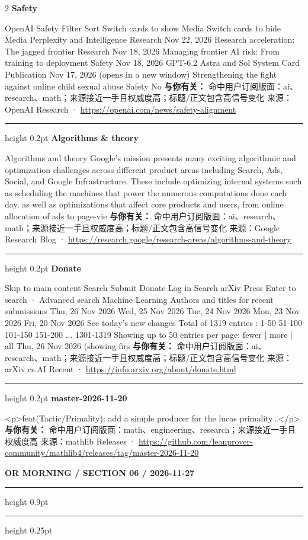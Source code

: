 \documentclass[10.5pt]{ctexart}
\begin{document}
\begin{multicols}{2}
{\large\bfseries Safety}\par
OpenAI Safety Filter Sort Switch cards to show Media Switch cards to hide Media Perplexity and Intelligence Research Nov 22, 2026 Research acceleration: The jagged frontier Research Nov 18, 2026 Managing frontier AI risk: From training to deployment Safety Nov 18, 2026 GPT‑6.2 Astra and Sol System Card Publication Nov 17, 2026 (opens in a new window) Strengthening the fight against online child sexual abuse Safety No
\textbf{与你有关：} 命中用户订阅版面：ai、research、math；来源接近一手且权威度高；标题/正文包含高信号变化
{\footnotesize\color{ormuted} 来源：OpenAI Research · \url{https://openai.com/news/safety-alignment}}
\vspace{2mm}
\hrule height 0.2pt
\vspace{2mm}
{\large\bfseries Algorithms \& theory}\par
Algorithms and theory Google’s mission presents many exciting algorithmic and optimization challenges across different product areas including Search, Ads, Social, and Google Infrastructure. These include optimizing internal systems such as scheduling the machines that power the numerous computations done each day, as well as optimizations that affect core products and users, from online allocation of ads to page-vie
\textbf{与你有关：} 命中用户订阅版面：ai、research、math；来源接近一手且权威度高；标题/正文包含高信号变化
{\footnotesize\color{ormuted} 来源：Google Research Blog · \url{https://research.google/research-areas/algorithms-and-theory}}
\vspace{2mm}
\hrule height 0.2pt
\vspace{2mm}
{\large\bfseries Donate}\par
Skip to main content Search Submit Donate Log in Search arXiv Press Enter to search · Advanced search Machine Learning Authors and titles for recent submissions Thu, 26 Nov 2026 Wed, 25 Nov 2026 Tue, 24 Nov 2026 Mon, 23 Nov 2026 Fri, 20 Nov 2026 See today's new changes Total of 1319 entries : 1-50 51-100 101-150 151-200 ... 1301-1319 Showing up to 50 entries per page: fewer | more | all Thu, 26 Nov 2026 (showing firs
\textbf{与你有关：} 命中用户订阅版面：ai、research、math；来源接近一手且权威度高；标题/正文包含高信号变化
{\footnotesize\color{ormuted} 来源：arXiv cs.AI Recent · \url{https://info.arxiv.org/about/donate.html}}
\vspace{2mm}
\hrule height 0.2pt
\vspace{2mm}
{\large\bfseries master-2026-11-20}\par
<p>feat(Tactic/Primality): add a simple producer for the lucas primality…</p>
\textbf{与你有关：} 命中用户订阅版面：math、engineering、research；来源接近一手且权威度高
{\footnotesize\color{ormuted} 来源：mathlib Releases · \url{https://github.com/leanprover-community/mathlib4/releases/tag/master-2026-11-20}}
\end{multicols}
\newpage
{\small\bfseries OR MORNING / SECTION 06 / 2026-11-27}
\vspace{2mm}
\hrule height 0.9pt
\vspace{1.5mm}
\hrule height 0.25pt
\vspace{4mm}
\end{document}
